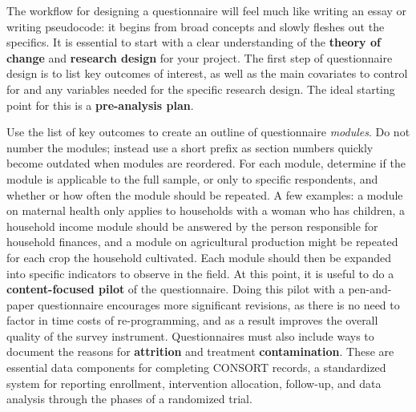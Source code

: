 The workflow for designing a questionnaire will feel much like writing an essay or writing pseudocode:
it begins from broad concepts and slowly fleshes out the specifics.
It is essential to start with a clear understanding of the
\textbf{theory of change}
and \textbf{research design} for your project.
The first step of questionnaire design is to list key outcomes of interest,
as well as the main covariates to control for and any variables needed for the specific research design.
The ideal starting point for this is a \textbf{pre-analysis plan}.

Use the list of key outcomes to create an outline of questionnaire \textit{modules}.
Do not number the modules; instead use a short prefix
as section numbers quickly become outdated when modules are reordered.
For each module, determine if the module is applicable to the full sample,
or only to specific respondents,
and whether or how often the module should be repeated.
A few examples:
a module on maternal health only applies
to households with a woman who has children,
a household income module should be answered
by the person responsible for household finances,
and a module on agricultural production
might be repeated for each crop the household cultivated.
Each module should then be expanded
into specific indicators to observe in the field.
At this point, it is useful to do a  \textbf{content-focused pilot}
of the questionnaire.
Doing this pilot with a pen-and-paper questionnaire encourages more significant revisions,
as there is no need to factor in time costs of re-programming,
and as a result improves the overall quality of the survey instrument.
Questionnaires must also include ways to document the reasons for \textbf{attrition} and
treatment \textbf{contamination}.
These are essential data components for completing CONSORT records,
a standardized system for reporting enrollment, intervention allocation, follow-up,
and data analysis through the phases of a randomized trial.\cite{begg1996improving}

